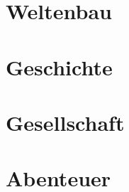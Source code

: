 \documentclass[a4paper,12pt,%
headsepline,%
numbers=noenddot,%
]{scrreprt}
\begin{document}
\part{Weltenbau}
 





\part{Geschichte}


\part{Gesellschaft}







\part{Abenteuer}



\end{document}
